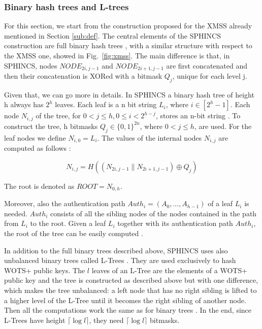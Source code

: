 \documentclass[a4paper,12pt]{article}
\def\myfig#1{Fig.~#1\xspace}
\begin{document}
\subsubsection{Binary hash trees and L-trees}

For this section, we start from the construction proposed for the XMSS already mentioned in Section \ref{sub:def}.
The central elements of the SPHINCS construction are full binary hash trees \cite{1_sphincspaper}, with a similar structure with respect to the XMSS one, showed in \myfig{\ref{fig:xmss}}. The main difference is that, in SPHINCS, nodes $NODE_{2i, j-1}$ and $NODE_{2i+1, j-1}$ are first concatenated and then their concatenation is XORed with a bitmask $Q_{j}$, unique for each level j.

Given that, we can go more in details.
In SPHINCS a binary hash tree of height h always has $2^{h}$ leaves. Each leaf is a n bit string $L_{i}$, where $i \in [2^{h} - 1]$.
Each node $N_{i,j}$ of the tree, for $0 < j \leq h, 0 \leq i < 2^{h-j}$, stores an n-bit string \cite{1_sphincspaper}.
To construct the tree, h bitmasks $Q_{j} \in \{0, 1\}^{2n}$, where $0 < j \leq h$, are used. For the leaf nodes we define $N_{i,0} = L_{i}$.
The values of the internal nodes $N_{i,j}$ are computed as follows \cite{1_sphincspaper}:

$$N_{i,j} = H((N_{2i,j-1} \parallel N_{2i+1,j-1}) \oplus Q_{j})$$

The root is denoted as $ROOT = N_{0,h}$.

Moreover, also the authentication path $Auth_{i} = (A_{0} , . . . , A_{h-1})$ of a leaf $L_{i}$ is needed. $Auth_{i}$ consists of all the sibling nodes of the nodes contained in the path from $L_{i}$ to the root. 
Given a leaf $L_{i}$ together with its authentication path $Auth_{i}$, the root of the tree can be easily computed \cite{1_sphincspaper}.

In addition to the full binary trees described above, SPHINCS uses also unbalanced binary trees called L-Trees \cite{1_sphincspaper}. They are used exclusively to hash WOTS+ public keys. The $l$ leaves of an L-Tree are the elements of a WOTS+ public key and the tree is constructed as described above but with one difference, which makes the tree unbalanced: a left node that has no right sibling is lifted to a higher level of the L-Tree until it becomes the right sibling of another node. Then all the computations work the same as for binary trees \cite{1_sphincspaper}. In the end, since L-Trees have height $\lceil \log l \rceil$, they need $\lceil \log l \rceil$ bitmasks.
\end{document}
